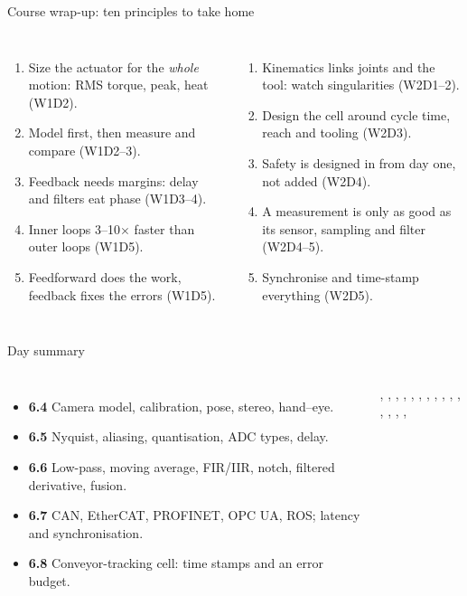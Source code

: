\documentclass[aspectratio=169,10pt]{beamer}
\begin{document}
\begin{frame}{Course wrap-up: ten principles to take home}
\begin{columns}[T]
\begin{enumerate}\small
\item Size the actuator for the \emph{whole} motion: RMS torque, peak, heat (W1D2).
\item Model first, then measure and compare (W1D2--3).
\item Feedback needs margins: delay and filters eat phase (W1D3--4).
\item Inner loops 3--10$\times$ faster than outer loops (W1D5).
\item Feedforward does the work, feedback fixes the errors (W1D5).
\end{enumerate}
\begin{enumerate}\small
\setcounter{enumi}{5}
\item Kinematics links joints and the tool: watch singularities (W2D1--2).
\item Design the cell around cycle time, reach and tooling (W2D3).
\item Safety is designed in from day one, not added (W2D4).
\item A measurement is only as good as its sensor, sampling and filter (W2D4--5).
\item Synchronise and time-stamp everything (W2D5).
\end{enumerate}
\end{columns}
\end{frame}

\begin{frame}{Day summary}
\begin{columns}[T]
\begin{itemize}\small
\item \textbf{6.4} Camera model, calibration, pose, stereo, hand--eye.
\item \textbf{6.5} Nyquist, aliasing, quantisation, ADC types, delay.
\item \textbf{6.6} Low-pass, moving average, FIR/IIR, notch, filtered derivative, fusion.
\item \textbf{6.7} CAN, EtherCAT, PROFINET, OPC UA, ROS; latency and synchronisation.
\item \textbf{6.8} Conveyor-tracking cell: time stamps and an error budget.
\end{itemize}
\begin{defbox}
\small
{}, , ,
, , ,
, , , ,
, , , ,
, 
\end{defbox}
\end{columns}
\end{frame}
\end{document}
